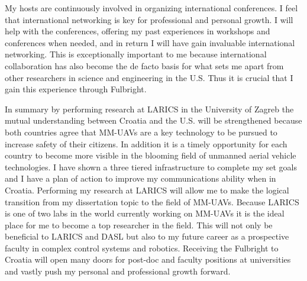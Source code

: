\documentclass[12pt]{article}
\begin{document}
My hosts are continuously involved in organizing international conferences.  
I feel that international networking is key for professional and personal growth.
I will help with the conferences, offering my past experiences in workshops and conferences when needed, and in return I will have gain invaluable international networking.
This is exceptionally important to me because international collaboration has also become the de facto basis for what sets me apart from other researchers in science and engineering in the U.S. 
Thus it is crucial that I gain this experience through Fulbright.




In summary by performing research at LARICS in the University of Zagreb the mutual understanding between Croatia and the U.S. will be strengthened because both countries agree that MM-UAVs are a key technology to be pursued to increase safety of their citizens.
In addition it is a timely opportunity for each country to become more visible in the blooming field of unmanned aerial vehicle technologies.  
I have shown a three tiered infrastructure to complete my set goals and I have a plan of action to improve my communications ability when in Croatia.
Performing my research at LARICS will allow me to make the logical transition from my dissertation topic to the field of MM-UAVs.  
Because LARICS is one of two labs in the world currently working on MM-UAVs it is the ideal place for me to become  a top researcher in the field.  
This will not only be beneficial to LARICS and DASL but also to my future career as a prospective faculty in complex control systems and robotics.
Receiving the Fulbright to Croatia will open many doors for post-doc and faculty positions at universities and vastly push my personal and professional growth forward.
\end{document}
